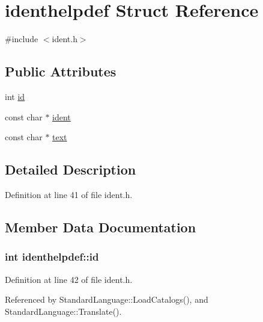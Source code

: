 \hypertarget{structidenthelpdef}{}\section{identhelpdef Struct Reference}
\label{structidenthelpdef}


{\ttfamily \#include $<$ident.\+h$>$}

\subsection*{Public Attributes}
\begin{DoxyCompactItemize}
\item 
int \hyperlink{structidenthelpdef_a7591721a8d15073664b95690c21ba57f}{id}
\item 
const char $\ast$ \hyperlink{structidenthelpdef_a9b9e38ad0068a6ee3c9a075f6412e10c}{ident}
\item 
const char $\ast$ \hyperlink{structidenthelpdef_ad2ce2c9f74dd7949618568812da41142}{text}
\end{DoxyCompactItemize}


\subsection{Detailed Description}


Definition at line 41 of file ident.\+h.



\subsection{Member Data Documentation}
\subsubsection[{\texorpdfstring{id}{id}}]{\setlength{\rightskip}{0pt plus 5cm}int identhelpdef\+::id}\hypertarget{structidenthelpdef_a7591721a8d15073664b95690c21ba57f}{}\label{structidenthelpdef_a7591721a8d15073664b95690c21ba57f}


Definition at line 42 of file ident.\+h.



Referenced by Standard\+Language\+::\+Load\+Catalogs(), and Standard\+Language\+::\+Translate().

